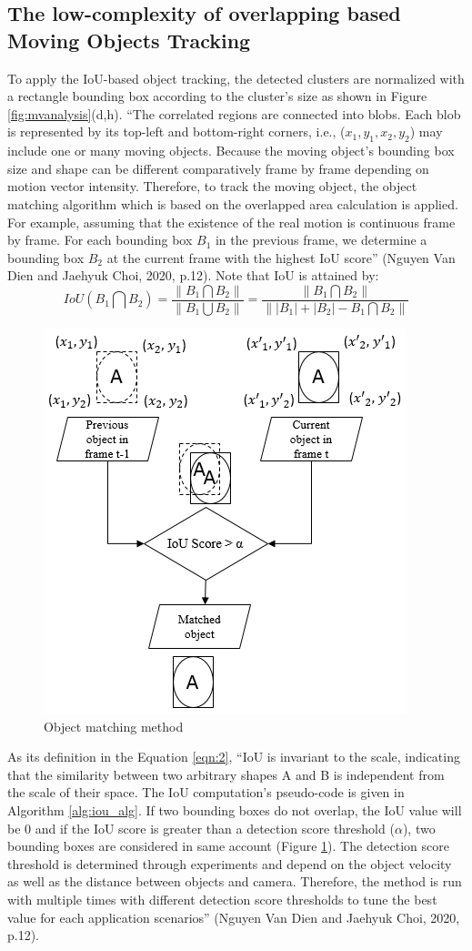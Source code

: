 \subsection{The low-complexity of overlapping based Moving Objects Tracking}
\label{subsec:1}
To apply the IoU-based object tracking, the detected clusters are normalized with a rectangle bounding box according to the cluster's size as shown in Figure \ref{fig:mvanalysis}(d,h). “The correlated regions are connected into blobs. Each blob is represented by its top-left and bottom-right corners, i.e.,  ($x_{1}, y_{1}, x_{2}, y_{2}$) may include one or many moving objects. Because the moving object's bounding box size and shape can be different comparatively frame by frame depending on motion vector intensity. Therefore, to track the moving object, the object matching algorithm which is based on the overlapped area calculation is applied. For example,  assuming that the existence of the real motion is continuous frame by frame. For each bounding box $B_{1}$ in the previous frame, we determine a bounding box $B_{2}$ at the current frame with the highest IoU score” (Nguyen Van Dien and Jaehyuk Choi, 2020, p.12). Note that IoU is attained by:\\
\begin{equation}
\label{eqn:2}
IoU(B_{1}\bigcap B_{2}) = \frac{\left \| B_{1}\bigcap B_{2} \right \|}{\left \| B_{1}\bigcup B_{2}  \right \|} =  \frac{\left \| B_{1}\bigcap B_{2} \right \|}{\left \| \left | B_{1} \right |  +  \left | B_{2} \right |  - B_{1}\bigcap B_{2} \right \|}
\end{equation} 
\begin{figure}
\centering
 \includegraphics[width=0.4\linewidth]{Figures/iou.png}
 \caption{Object matching method}
 \label{fig:iou}
\end{figure}
 As its definition in the Equation \ref{eqn:2}, “IoU is invariant to the scale, indicating that the similarity between two arbitrary shapes A and B is independent from the scale of their space. The IoU computation’s pseudo-code is given in Algorithm \ref{alg:iou_alg}. If two bounding boxes do not overlap, the IoU value will be 0 and if the IoU score is greater than a detection score threshold ($\alpha$), two bounding boxes are considered in same account (Figure \ref{fig:iou}). The detection score threshold is determined through experiments and depend on the object velocity as well as the distance between objects and camera. Therefore, the method is run with multiple times with different detection score thresholds to tune the best value for each application scenarios” (Nguyen Van Dien and Jaehyuk Choi, 2020, p.12). 
